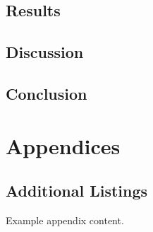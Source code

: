 \documentclass[11pt,english,a4paper,hidelinks]{book}
\begin{document}
\chapter{Results}

\chapter{Discussion}

\chapter{Conclusion}

\printbibliography[heading=bibintoc, title=Bibliography]
\label{sec:biblio}
\newpage

\part{Appendices}
\def\thechapter{\Alph{chapter}}
\makeatletter
\renewcommand{\@chapapp}{Appendix}
\makeatother

\chapter{Additional Listings}
Example appendix content.
\end{document}
